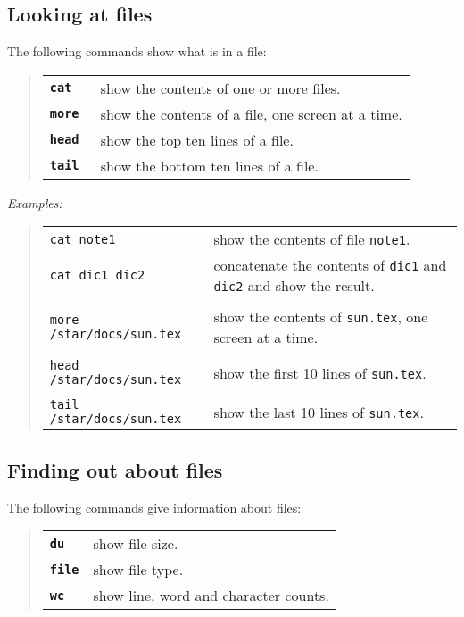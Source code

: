 \subsection{Looking at files}

The following commands show what is in a file:

\begin{quote}
\begin{tabular}{lp{5.2in}}

{\tt\bf cat }  & show the contents of one or more files. \\

{\tt\bf more } & show the contents of a file, one screen at a time. \\

{\tt\bf head} & show the top ten lines of a file. \\

{\tt\bf tail} & show the bottom ten lines of a file.

\end{tabular}
\end{quote}
\goodbreak

{\em Examples:}

\begin{quote}
\begin{tabular}{lp{3.5in}}
{\tt cat note1} & show the contents of file {\tt note1}. \\
{\tt cat dic1 dic2} & concatenate the contents of {\tt dic1} and {\tt dic2} and
   show the result.\\
\\
{\tt more /star/docs/sun.tex} & show the contents of {\tt sun.tex}, one screen
   at a time.\\
\\
{\tt head /star/docs/sun.tex} & show the first 10 lines of {\tt sun.tex}.\\
\\
{\tt tail /star/docs/sun.tex} & show the last 10 lines of {\tt sun.tex}.
\end{tabular}
\end{quote}

\subsection{Finding out about files}

The following commands give information about files:

\begin{quote}
\begin{tabular}{lp{5.2in}}

{\tt\bf du }  & show file size.\\
{\tt\bf file} & show file type.\\
{\tt\bf wc} & show line, word and character counts.\\

\end{tabular}
\end{quote}


